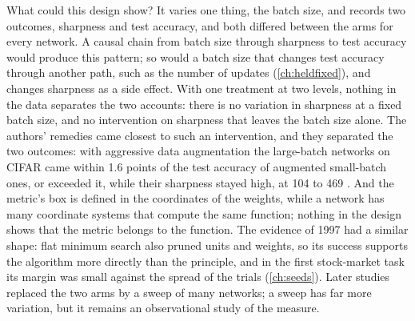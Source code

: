 \begin{refsection}
\begin{experiment}
\end{experiment}

What could this design show? It varies one thing, the batch size, and records two outcomes, sharpness and test accuracy, and both differed between the arms for every network. A causal chain from batch size through sharpness to test accuracy would produce this pattern; so would a batch size that changes test accuracy through another path, such as the number of updates (\cref{ch:heldfixed}), and changes sharpness as a side effect. With one treatment at two levels, nothing in the data separates the two accounts: there is no variation in sharpness at a fixed batch size, and no intervention on sharpness that leaves the batch size alone. The authors' remedies came closest to such an intervention, and they separated the two outcomes: with aggressive data augmentation the large-batch networks on CIFAR came within 1.6 points of the test accuracy of augmented small-batch ones, or exceeded it, while their sharpness stayed high, at 104 to 469 \parencite[Appendix~E]{KeskarEtAl2017}. And the metric's box is defined in the coordinates of the weights, while a network has many coordinate systems that compute the same function; nothing in the design shows that the metric belongs to the function. The evidence of 1997 had a similar shape: flat minimum search also pruned units and weights, so its success supports the algorithm more directly than the principle, and in the first stock-market task its margin was small against the spread of the trials (\cref{ch:seeds}). Later studies replaced the two arms by a sweep of many networks; a sweep has far more variation, but it remains an observational study of the measure.


\end{refsection}
